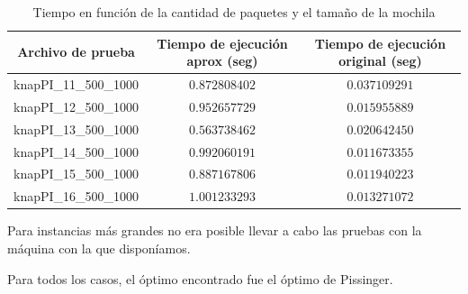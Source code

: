 \documentclass[a4paper,10pt]{article}
\begin{document}
\begin{table}[H]
\centering
\begin{tabular}{|c|c|c|}
\hline
Archivo de prueba	& Tiempo de ejecución aprox (seg) & Tiempo de ejecución original (seg)\\\hline
knapPI\_11\_500\_1000	& $0.872808402$ & $0.037109291$ \\\hline 
knapPI\_12\_500\_1000	& $0.952657729$ & $0.015955889$ \\\hline 
knapPI\_13\_500\_1000	& $0.563738462$ & $0.020642450$ \\\hline 
knapPI\_14\_500\_1000	& $0.992060191$ & $0.011673355$ \\\hline 
knapPI\_15\_500\_1000	& $0.887167806$ & $0.011940223$ \\\hline 
knapPI\_16\_500\_1000	& $1.001233293$ & $0.013271072$ \\\hline 
\end{tabular}
\caption{Tiempo en función de la cantidad de paquetes y el tamaño de la mochila}
\label{tab:held}
\end{table}

Para instancias más grandes no era posible llevar a cabo las pruebas con la máquina con la que disponíamos.

Para todos los casos, el óptimo encontrado fue el óptimo de Pissinger.
\end{document}
